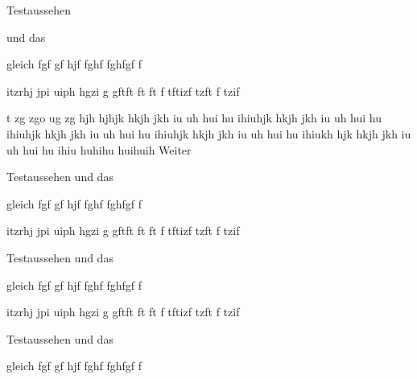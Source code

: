 \documentclass{teacher}
\begin{document}
Testaussehen \theformatierung
\setlength{\lkaabstand}{9mm}

\lka[3]

\grad und das 

\entspricht{} gleich 
fgf gf hjf fghf fghfgf f 


itzrhj jpi uiph hgzi g gftft ft ft f tftizf tzft f tzif





\normalsize


t zg zgo ug zg  hjh hjhjk hkjh jkh iu uh hui hu ihiuhjk hkjh jkh iu uh hui hu ihiuhjk hkjh jkh iu uh hui hu ihiuhjk hkjh jkh iu uh hui hu ihiukh  hjk hkjh jkh iu uh hui hu ihiu
huhihu huihuih
 \llv[4]
Weiter
\unterschrift




Testaussehen 
\grad und das 

\entspricht{} gleich 
fgf gf hjf fghf fghfgf f 


itzrhj jpi uiph hgzi g gftft ft ft f tftizf tzft f tzif



Testaussehen 
\grad und das 

\entspricht{} gleich 
fgf gf hjf fghf fghfgf f 


itzrhj jpi uiph hgzi g gftft ft ft f tftizf tzft f tzif



Testaussehen 
\grad und das 

\entspricht{} gleich 
fgf gf hjf fghf fghfgf f 

\end{document}
